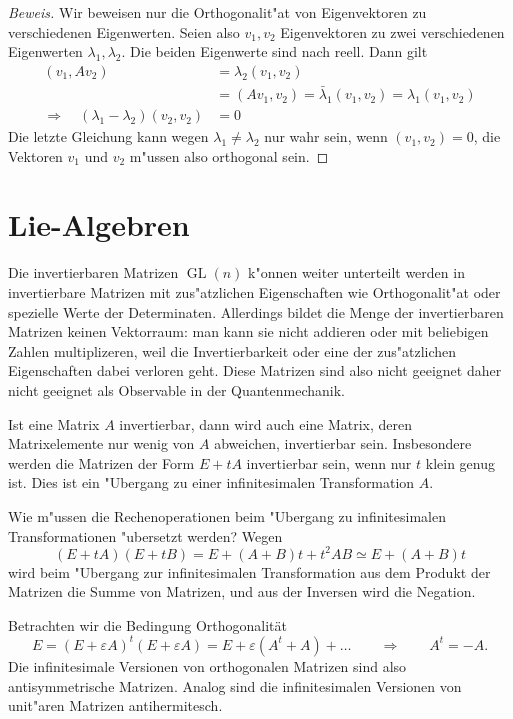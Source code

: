 \begin{proof}[Beweis]
Wir beweisen nur die Orthogonalit"at von Eigenvektoren zu verschiedenen 
Eigenwerten. Seien also $v_1,v_2$ Eigenvektoren zu zwei verschiedenen
Eigenwerten $\lambda_1,\lambda_2$. Die beiden Eigenwerte sind nach
\label{ewreell} reell. Dann gilt
\begin{align*}
(v_1,Av_2)&=\lambda_2(v_1,v_2)
\\
          &=(Av_1,v_2)=\bar\lambda_1(v_1,v_2)=\lambda_1(v_1,v_2)
\\
\Rightarrow\quad
(\lambda_1-\lambda_2)(v_2,v_2)&=0
\end{align*}
Die letzte Gleichung kann wegen $\lambda_1\ne\lambda_2$ nur wahr sein,
wenn $(v_1,v_2)=0$, die Vektoren $v_1$ und $v_2$ m"ussen also orthogonal sein.
\end{proof}

\section{Lie-Algebren}
Die invertierbaren Matrizen $\operatorname{GL}(n)$ k"onnen weiter
unterteilt werden in invertierbare Matrizen mit zus"atzlichen
Eigenschaften wie Orthogonalit"at oder spezielle Werte der Determinaten.
Allerdings bildet die Menge der invertierbaren Matrizen keinen
Vektorraum: man kann sie nicht addieren oder mit beliebigen Zahlen
multiplizeren, weil die Invertierbarkeit oder eine der zus"atzlichen
Eigenschaften dabei verloren geht. Diese Matrizen sind also nicht
geeignet daher nicht geeignet als Observable in der Quantenmechanik.

Ist eine Matrix $A$ invertierbar, dann wird auch eine Matrix, deren
Matrixelemente nur wenig von $A$ abweichen, invertierbar sein.
Insbesondere werden die Matrizen der Form $E+tA$ invertierbar sein,
wenn nur $t$ klein genug ist. Dies ist ein "Ubergang zu einer 
infinitesimalen Transformation $A$.

Wie m"ussen die Rechenoperationen beim "Ubergang zu infinitesimalen
Transformationen "ubersetzt werden?
Wegen
\[
(E+tA)(E+tB)=E+(A+B)t + t^2AB\simeq E+(A+B)t
\]
wird beim "Ubergang zur infinitesimalen Transformation aus dem Produkt
der Matrizen die Summe von Matrizen, und aus der Inversen wird die Negation.

Betrachten wir die Bedingung Orthogonalit\"at
\[
E=
(E+\varepsilon A)^t(E+\varepsilon A)
=
E+\varepsilon (A^t+A) + \dots
\qquad
\Rightarrow
\qquad
A^t=-A.
\]
Die infinitesimale Versionen von orthogonalen Matrizen sind also
antisymmetrische Matrizen.
Analog sind die infinitesimalen Versionen von unit"aren Matrizen
antihermitesch.

